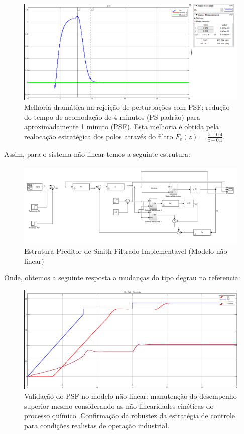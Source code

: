 \documentclass[a4paper,12pt]{article}
\begin{document}
\begin{figure}[H]
    \centering
    \includegraphics[width=0.9\linewidth]{image5.png}
    \caption{Melhoria dramática na rejeição de perturbações com PSF: redução do tempo de acomodação de 4 minutos (PS padrão) para aproximadamente 1 minuto (PSF). Esta melhoria é obtida pela realocação estratégica dos polos através do filtro $F_e(z) = \frac{z-0.4}{z-0.1}$.}
    \label{fig:psf_step_response_disturbance}
\end{figure}

Assim, para o sistema não linear temos a seguinte estrutura:

\begin{figure}[H]
    \centering
    \includegraphics[width=0.9\linewidth]{image6.png}
    \caption{Estrutura Preditor de Smith Filtrado Implementavel (Modelo não linear)}
    \label{fig:psf_nonlinear_structure}
\end{figure}

Onde, obtemos a seguinte resposta a mudanças do tipo degrau na referencia:

\begin{figure} [H]
    \centering
    \includegraphics[width=0.9\linewidth]{image7.png}
    \caption{Validação do PSF no modelo não linear: manutenção do desempenho superior mesmo considerando as não-linearidades cinéticas do processo químico. Confirmação da robustez da estratégia de controle para condições realistas de operação industrial.}
    \label{fig:psf_nonlinear_ref_response}
\end{figure}
\end{document}

